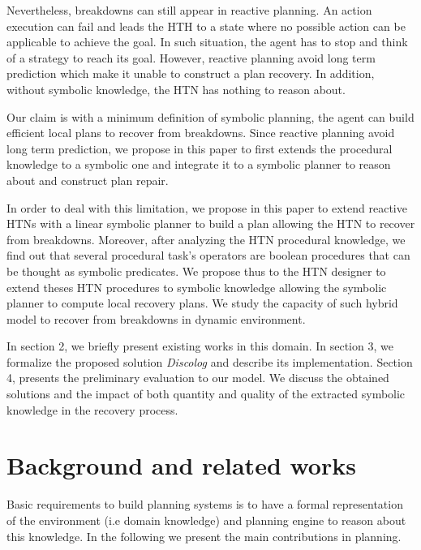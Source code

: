 \documentclass[conference]{IEEEtran}
\begin{document}
	\par Nevertheless, breakdowns can still appear in reactive planning. An action execution can fail and leads the HTH to a state where no possible action can be applicable to achieve the goal. 
	In such situation, the agent has to stop and think of a strategy to reach its goal. However, reactive planning avoid long term prediction which make it unable to construct a plan recovery. In addition,  without symbolic knowledge, the HTN has nothing to reason about.  
	
	
	Our claim is with a minimum definition of symbolic planning, the agent can build efficient local plans to recover from breakdowns. Since reactive planning avoid long term prediction, we propose in this paper to first extends the procedural knowledge to a symbolic one and integrate it to a symbolic planner to reason about and construct plan repair.
	\par  In order to deal with this limitation, we propose in this paper to extend reactive HTNs with a linear symbolic planner to build a plan allowing the HTN to recover from breakdowns. Moreover, after analyzing the HTN procedural knowledge, we find out that several procedural task's operators are boolean procedures that can be thought as symbolic predicates.	We propose  thus to the HTN designer to extend theses HTN procedures to  symbolic knowledge allowing the symbolic planner to  compute local recovery plans. We study the capacity of such hybrid model to recover from breakdowns in dynamic environment. 
	
	\par In section 2, we briefly present existing works in this domain. In section 3, we formalize the proposed solution \textit{Discolog} and describe its implementation. Section 4, presents the preliminary evaluation to our model. We discuss the obtained solutions and the impact of both quantity and quality of the extracted symbolic knowledge in the recovery process. 
	
	\section{Background and related works}
	Basic requirements to build planning systems is to have a formal representation of the environment (i.e domain knowledge) and planning engine to reason about this knowledge. In the following we present the main contributions in planning.
	
\end{document}

